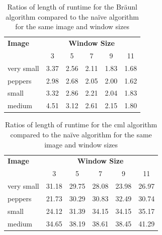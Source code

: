 \begin{table}
\centering
\caption[Ratios runtime for the Bräunl algorithm vs the naïve algorithm]{Ratios of length of runtime for the Bräunl algorithm compared to the naïve algorithm for the same image and window sizes}
\label{tab:median:ratbraun}
\begin{tabular}{@{}lccccc@{}}
\toprule
\textbf{Image} & \multicolumn{5}{c}{\textbf{Window Size}} \\
               & 3      & 5      & 7      & 9     & 11    \\ \midrule
very small     & 3.37   & 2.56   & 2.11   & 1.83  & 1.68  \\
peppers        & 2.98   & 2.68   & 2.05   & 2.00     & 1.62  \\
small          & 3.32   & 2.86   & 2.21   & 2.04  & 1.83  \\
medium         & 4.51   & 3.12   & 2.61   & 2.15  & 1.80   \\ \bottomrule
\end{tabular}
\end{table}

\begin{table}
\centering
\caption[Ratios of runtime for the  algorithm compared to the naïve algorithm]{Ratios of length of runtime for the \gls{cml} algorithm compared to the naïve algorithm for the same image and window sizes}
\label{tab:median:ratcml}
\begin{tabular}{@{}lccccc@{}}
\toprule
\textbf{Image} & \multicolumn{5}{c}{\textbf{Window Size}} \\
               & 3      & 5      & 7      & 9     & 11    \\ \midrule
very small     & 31.18  & 29.75  & 28.08  & 23.98 & 26.97 \\
peppers        & 21.73  & 30.29  & 30.83  & 32.49 & 30.74 \\
small          & 24.12  & 31.39  & 34.15  & 34.15 & 35.17 \\
medium         & 34.65  & 38.19  & 38.61  & 38.45 & 41.29 \\ \bottomrule
\end{tabular}
\end{table}

